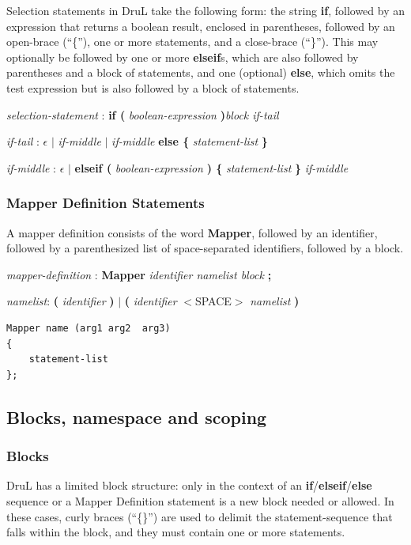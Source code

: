 \documentclass[11pt,twoside]{article}
\begin{document}
Selection statements in DruL take the following form: the string \textbf{if}, followed by an expression that returns a boolean result, enclosed in parentheses, followed by an open-brace (``\{''), one or more statements, and a close-brace (``\}'').  This may optionally be followed by one or more \textbf{elseif}s, which are also followed by parentheses and a block of statements, and one (optional) \textbf{else}, which omits the test expression but is also followed by a block of statements.

\emph{selection-statement} : \textbf{if ( } \emph{boolean-expression} \textbf{ )}\emph{block if-tail}

\emph{if-tail} : $\epsilon$ $|$ \emph{if-middle} $|$
	\emph{if-middle} \textbf{else \{} \emph{statement-list} \textbf{\}} 

\emph{if-middle} : $\epsilon$ $|$   \textbf{elseif ( } \emph{boolean-expression} \textbf{ ) \{} \emph{statement-list} \textbf{\}} \emph{if-middle} 

\subsubsection{Mapper Definition Statements}

A mapper definition consists of the word \textbf{Mapper}, followed by an identifier, followed by a parenthesized list of space-separated identifiers, followed by a block.

\emph{mapper-definition} : \textbf{Mapper} \emph{identifier namelist block} \textbf{;}

\emph{namelist}: \textbf ( \emph{identifier} \textbf ) $|$  \textbf ( \emph{identifier} 
$<$SPACE$>$ \emph{namelist} \textbf )

\begin{verbatim}
Mapper name (arg1 arg2  arg3)
{
    statement-list
};
\end{verbatim}





\subsection{Blocks, namespace and scoping}

\subsubsection{Blocks}

DruL has a limited block structure: only in the context of an \textbf{if}/\textbf{elseif}/\textbf{else} sequence or a Mapper Definition statement is a new block needed or allowed.  In these cases, curly braces (``\{\}'') are used to delimit the statement-sequence that falls within the block, and they must contain one or more statements.
\end{document}
